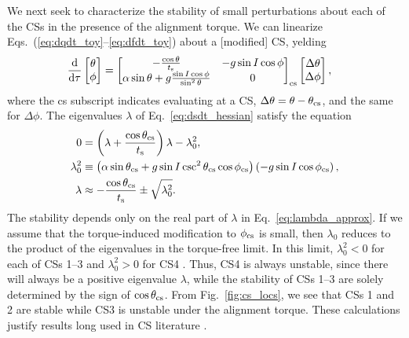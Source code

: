 \documentclass[
        fleqn,
        usenatbib,
    ]{mnras}
\newcommand*{\rd}[2]{\frac{\mathrm{d}#1}{\mathrm{d}#2}}
\newcommand*{\p}[1]{\left(#1\right)}
\begin{document}
We next seek to characterize the stability of small perturbations about each of
the CSs in the presence of the alignment torque. We can linearize
Eqs.~(\ref{eq:dqdt_toy}--\ref{eq:dfdt_toy}) about a [modified] CS, yelding
\begin{align}
    \rd{}{\tau}\begin{bmatrix}
        \theta\\ \phi
    \end{bmatrix} &= \begin{bmatrix}
        -\frac{\cos \theta}{t_{\rm s}} &
        -g\sin I \cos \phi \\
        \alpha \sin \theta + g\frac{\sin I \cos \phi}{\sin^2\theta} &
        0
    \end{bmatrix}_{\rm cs}\begin{bmatrix}
        \Delta \theta \\ \Delta \phi
    \end{bmatrix},\label{eq:dsdt_hessian}
\end{align}
where the cs subscript indicates evaluating at a CS, $\Delta \theta = \theta -
\theta_{\rm cs}$, and the same for $\Delta \phi$. The eigenvalues $\lambda$ of
Eq.~\eqref{eq:dsdt_hessian} satisfy the equation
\begin{align}
    0 &= \p{\lambda + \frac{\cos \theta_{\rm cs}}{t_{\rm s}}}\lambda - \lambda_0^2,\\
    \lambda_0^2 &\equiv \p{\alpha
        \sin \theta_{\rm cs} + g\sin I \csc^2\theta_{\rm cs}\cos \phi_{\rm cs}}
            \p{- g \sin I \cos \phi_{\rm cs}},\\
    \lambda &\approx -\frac{\cos \theta_{\rm cs}}{t_{\rm s}} \pm \sqrt{\lambda_0^2}.
        \label{eq:lambda_approx}
\end{align}
The stability depends only on the real part of
$\lambda$ in Eq.~\eqref{eq:lambda_approx}. If we assume that the torque-induced
modification to $\phi_{\rm cs}$ is small, then $\lambda_0$ reduces to the
product of the eigenvalues in the torque-free limit. In this limit, $\lambda_0^2
< 0$ for each of CSs 1--3 and $\lambda_0^2 > 0$ for CS4 \citep[see Fig.~17
of][]{su2020}. Thus, CS4 is always unstable, since there will always be a
positive eigenvalue $\lambda$, while the stability of CSs 1--3 are solely
determined by the sign of $\cos \theta_{\rm cs}$. From Fig.~\ref{fig:cs_locs},
we see that CSs 1 and 2 are stable while CS3 is unstable under the alignment
torque. These calculations justify results long used in CS literature
\citep[e.g.][]{ward1975tidal}.
\end{document}
